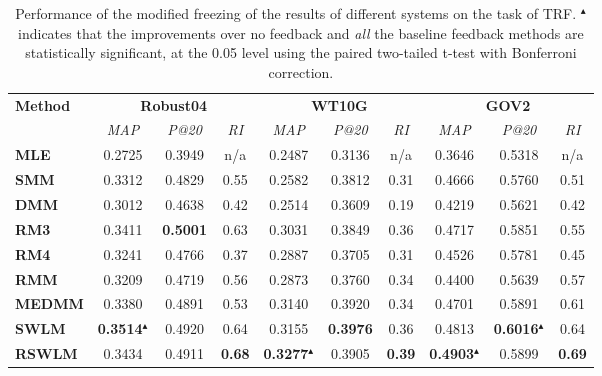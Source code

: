 \begin{table}[tbp]
\centering
\caption{\label{tbl_rf}Performance of the modified freezing of the results of different systems on the task of TRF. $^\blacktriangleup$ indicates that the improvements over no feedback and \emph{all} the baseline feedback methods are statistically significant, at the 0.05 level using the paired two-tailed t-test with Bonferroni correction.}
\begin{adjustbox}{max width=\columnwidth}
\begin{tabular}{lccccccccc}
\toprule
\multirow{2}{*}{\textbf{Method}} &
\multicolumn{3}{c}{\textbf{Robust04}} & \multicolumn{3}{c}{\textbf{WT10G}} & \multicolumn{3}{c}{\textbf{GOV2}} 
\\ \cmidrule(lr){2-4} \cmidrule(lr){5-7} \cmidrule(lr){8-10}
& \textit{MAP} & \textit{P@20} & \textit{RI} & \textit{MAP} & \textit{P@20} &  \textit{RI} &  \textit{MAP} & \textit{P@20}   & \textit{RI} 
\\ \midrule
\textbf{MLE} & 0.2725 & 0.3949 & n/a & 0.2487 & 0.3136 & n/a & 0.3646 & 0.5318 & n/a
\\ 
\textbf{SMM} & 0.3312 & 0.4829 & 0.55 & 0.2582 & 0.3812 & 0.31 & 0.4666 & 0.5760 & 0.51 
\\ 
\textbf{DMM} & 0.3012 & 0.4638 & 0.42 & 0.2514 & 0.3609 & 0.19 & 0.4219 & 0.5621 & 0.42
\\ 
\textbf{RM3} & 0.3411 & \textbf{0.5001} & 0.63 & 0.3031 & 0.3849 & 0.36 & 0.4717 & 0.5851 & 0.55
\\ 
\textbf{RM4} & 0.3241 & 0.4766 & 0.37 & 0.2887 & 0.3705 & 0.31 & 0.4526 & 0.5781 & 0.45
\\ 
\textbf{RMM} & 0.3209 & 0.4719 & 0.56 & 0.2873 & 0.3760 & 0.34  & 0.4400 & 0.5639 & 0.57
\\ 
\textbf{MEDMM} & 0.3380 & 0.4891 & 0.53 & 0.3140 & 0.3920 & 0.34 & 0.4701 & 0.5891 & 0.61 \\ 
\textbf{SWLM} & \textbf{0.3514}$^\blacktriangleup$ &  0.4920 & 0.64 & 0.3155 & \textbf{0.3976} & 0.36 & 0.4813 & \textbf{0.6016}$^\blacktriangleup$ & 0.64 
\\ 
\textbf{RSWLM} & 0.3434 & 0.4911 & \textbf{0.68} & \textbf{0.3277}$^\blacktriangleup$ & 0.3905 & \textbf{0.39} & \textbf{0.4903}$^\blacktriangleup$ & 0.5899 & \textbf{0.69}
\\ \bottomrule
\end{tabular}
\end{adjustbox}
\end{table}



